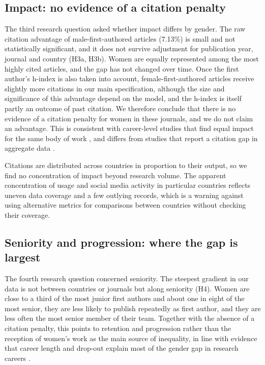 \documentclass[preprint,12pt,number]{elsarticle}
\begin{document}
\subsection{Impact: no evidence of a citation penalty}

The third research question asked whether impact differs by gender. The raw citation advantage of male-first-authored articles (7.13\%) is small and not statistically significant, and it does not survive adjustment for publication year, journal and country (H3a, H3b). Women are equally represented among the most highly cited articles, and the gap has not changed over time. Once the first author's h-index is also taken into account, female-first-authored articles receive slightly more citations in our main specification, although the size and significance of this advantage depend on the model, and the h-index is itself partly an outcome of past citation. We therefore conclude that there is no evidence of a citation penalty for women in these journals, and we do not claim an advantage. This is consistent with career-level studies that find equal impact for the same body of work \citep{Huang2020}, and differs from studies that report a citation gap in aggregate data \citep{Lariviere2013}.

Citations are distributed across countries in proportion to their output, so we find no concentration of impact beyond research volume. The apparent concentration of usage and social media activity in particular countries reflects uneven data coverage and a few outlying records, which is a warning against using alternative metrics for comparisons between countries without checking their coverage.

\subsection{Seniority and progression: where the gap is largest}

The fourth research question concerned seniority. The steepest gradient in our data is not between countries or journals but along seniority (H4). Women are close to a third of the most junior first authors and about one in eight of the most senior, they are less likely to publish repeatedly as first author, and they are less often the most senior member of their team. Together with the absence of a citation penalty, this points to retention and progression rather than the reception of women's work as the main source of inequality, in line with evidence that career length and drop-out explain most of the gender gap in research careers \citep{Huang2020}.
\end{document}
